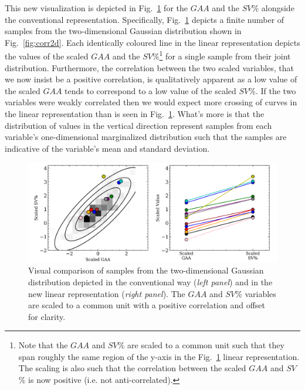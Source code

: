 This new visualization is
depicted in Fig.~\ref{fig:linrep} for the $GAA$ and the $SV$\% alongside the conventional
representation. Specifically, Fig.~\ref{fig:linrep}
depicts a finite number of samples from the two-dimensional Gaussian distribution shown
in Fig.~\ref{fig:corr2d}. Each identically coloured line in the
linear representation depicts the values of the scaled $GAA$ and the $SV$\%\footnote{Note
  that the $GAA$ and $SV$\% are scaled to a common unit such that they span roughly
  the same region of the y-axis in the Fig.~\ref{fig:linrep} linear representation.
  The scaling is also such that the correlation between the scaled $GAA$ and $SV$\% is
  now positive (i.e. not anti-correlated).} for a single
sample from their joint distribution. Furthermore, the correlation between the two scaled
variables,
that we now insist be a positive correlation, is qualitatively apparent as a low value
of the scaled $GAA$ tends to correspond to a low value of the scaled $SV$\%. If the two
variables were weakly correlated then we would expect more crossing of curves in the
linear representation than is seen in Fig.~\ref{fig:linrep}. What's more is that the
distribution of values in the vertical direction represent samples from each variable's
one-dimensional marginalized distribution such that the samples are indicative of the
variable's mean and standard deviation. \\

\begin{figure}
  \centering
  \includegraphics[width=\hsize]{figures/linearrep_v1.png}
  \caption[Linear representation of Gaussian random variables in two dimensions.]
          {Visual comparison of samples from the two-dimensional Gaussian distribution
            depicted in the conventional way (\emph{left panel}) and in the new linear
            representation (\emph{right panel}).
            The $GAA$ and $SV$\% variables are scaled to a common unit with a
            positive correlation and offset for clarity.}
  \label{fig:linrep}
\end{figure}


